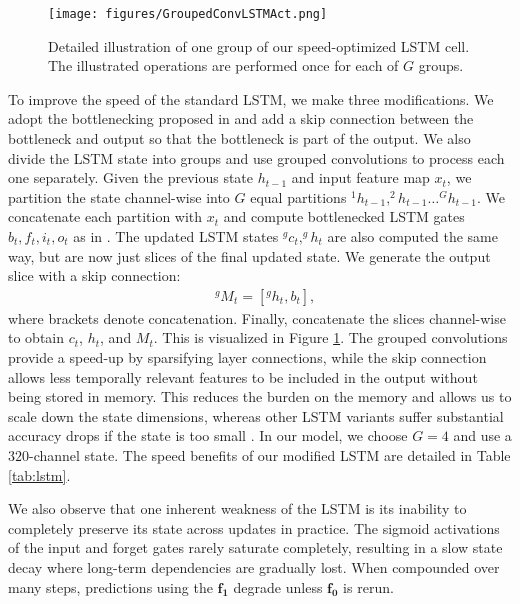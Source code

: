 \documentclass[10pt,twocolumn,letterpaper]{article}
\begin{document}
\begin{figure}[ht]
\begin{center}
  \texttt{[image: figures/GroupedConvLSTMAct.png]}
\vspace{-2em}
\end{center}
  \caption{Detailed illustration of one group of our speed-optimized LSTM cell. The illustrated operations are performed once for each of $G$ groups.}
\label{fig:fast-lstm}
\end{figure}


To improve the speed of the standard LSTM, we make three modifications. We adopt the bottlenecking proposed in \cite{liu2018mobile} and add a skip connection between the bottleneck and output so that the bottleneck is part of the output. We also divide the LSTM state into groups and use grouped convolutions to process each one separately. Given the previous state $h_{t-1}$ and input feature map $x_t$, we partition the state channel-wise into $G$ equal partitions $^{1}h_{t-1}, ^{2}h_{t-1} \ldots ^{G}h_{t-1}$. We concatenate each partition with $x_t$ and compute bottlenecked LSTM gates $b_t, f_t, i_t, o_t$ as in \cite{liu2018mobile}. The updated LSTM states $^{g}c_t, ^{g}h_t$ are also computed the same way, but are now just slices of the final updated state. We generate the output slice with a skip connection:
\begin{align*}
&^{g}M_t = [^{g}h_t, b_t],
\end{align*}
where brackets denote concatenation. Finally, concatenate the slices channel-wise to obtain $c_t$, $h_t$, and $M_t$. This is visualized in Figure \ref{fig:fast-lstm}. The grouped convolutions provide a speed-up by sparsifying layer connections, while the skip connection allows less temporally relevant features to be included in the output without being stored in memory. This reduces the burden on the memory and allows us to scale down the state dimensions, whereas other LSTM variants suffer substantial accuracy drops if the state is too small \cite{liu2018mobile}. In our model, we choose $G=4$ and use a $320$-channel state. The speed benefits of our modified LSTM are detailed in Table \ref{tab:lstm}.

We also observe that one inherent weakness of the LSTM is its inability to completely preserve its state across updates in practice. The sigmoid activations of the input and forget gates rarely saturate completely, resulting in a slow state decay where long-term dependencies are gradually lost. When compounded over many steps, predictions using the $\mathbf{f_1}$ degrade unless $\mathbf{f_0}$ is rerun.
\end{document}
